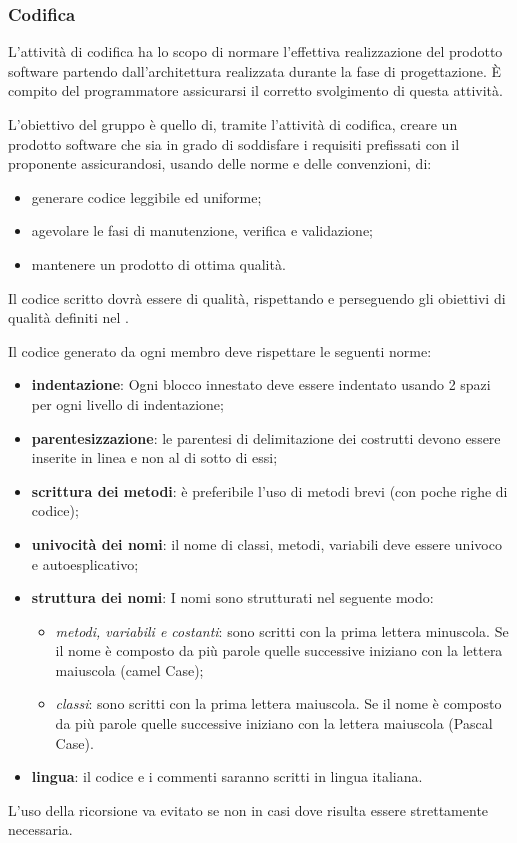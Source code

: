 \subsubsection{Codifica}
L'attività di codifica ha lo scopo di normare l'effettiva realizzazione del prodotto software partendo dall'architettura realizzata durante la fase di progettazione. È compito del programmatore assicurarsi il corretto svolgimento di questa attività.

L'obiettivo del gruppo \Omicron{} è quello di, tramite l'attività di codifica, creare un prodotto software che sia in grado di soddisfare i requisiti prefissati con il proponente assicurandosi, usando delle norme e delle convenzioni, di:
\begin{itemize}
\item generare codice leggibile ed uniforme;
\item agevolare le fasi di manutenzione, verifica e validazione;
\item mantenere un prodotto di ottima qualità. 
\end{itemize}

Il codice scritto dovrà essere di qualità, rispettando e perseguendo gli obiettivi di qualità definiti nel \PdQv.

Il codice generato da ogni membro deve rispettare le seguenti norme:
\begin{itemize}
\item \textbf{indentazione}: Ogni blocco innestato deve essere indentato usando 2 spazi per ogni livello di indentazione;
\item \textbf{parentesizzazione}: le parentesi di delimitazione dei costrutti devono essere inserite in linea e non al di sotto di essi;
\item \textbf{scrittura dei metodi}: è preferibile l'uso di metodi brevi (con poche righe di codice);
\item \textbf{univocità dei nomi}: il nome di classi, metodi, variabili deve essere univoco e autoesplicativo;
\item \textbf{struttura dei nomi}: I nomi sono strutturati nel seguente modo:
\begin{itemize}
\item \textit{metodi, variabili e costanti}: sono scritti con la prima lettera minuscola. Se il nome è composto da più parole quelle successive iniziano con la lettera maiuscola (camel Case);
\item \textit{classi}: sono scritti con la prima lettera maiuscola. Se il nome è composto da più parole quelle successive iniziano con la lettera maiuscola (Pascal Case).
\end{itemize} 
\item \textbf{lingua}: il codice e i commenti saranno scritti in lingua italiana.
\end{itemize}

L'uso della ricorsione va evitato se non in casi dove risulta essere strettamente necessaria.
